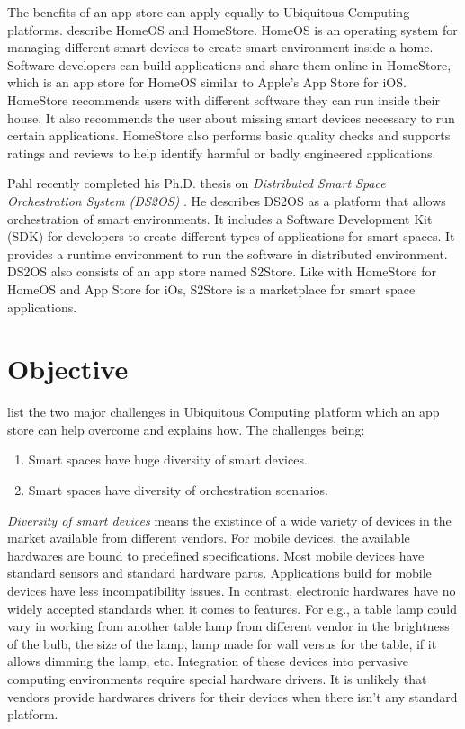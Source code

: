 The benefits of an app store can apply equally to Ubiquitous Computing platforms. \cite{dixon2010home} describe HomeOS and HomeStore. HomeOS is an operating system for managing different smart devices to create smart environment inside a home. Software developers can build applications and share them online in HomeStore, which is an app store for HomeOS similar to Apple's App Store for iOS. HomeStore recommends users with different software they can run inside their house. It also recommends the user about missing smart devices necessary to run certain applications. HomeStore also performs basic quality checks and supports ratings and reviews to help identify harmful or badly engineered applications.

Pahl recently completed his Ph.D. thesis on \emph{Distributed Smart Space Orchestration System (DS2OS)} \cite{pahl2014distributed}. He describes DS2OS as a platform that allows orchestration of smart environments. It includes a Software Development Kit (SDK) for developers to create different types of applications for smart spaces. It provides a runtime environment to run the software in distributed environment. DS2OS also consists of an app store named S2Store. Like with HomeStore for HomeOS and App Store for iOs, S2Store is a marketplace for smart space applications.

\section{Objective}

\cite{pahl2014distributed} list the two major challenges in Ubiquitous Computing platform which an app store can help overcome and explains how. The challenges being:

\begin{enumerate}
  \item Smart spaces have huge diversity of smart devices.
  \item Smart spaces have diversity of orchestration scenarios.
\end{enumerate}

\emph{Diversity of smart devices} means the existince of a wide variety of devices in the market available from different vendors. For mobile devices, the available hardwares are bound to predefined specifications. Most mobile devices have standard sensors and standard hardware parts. Applications build for mobile devices have less incompatibility issues. In contrast, electronic hardwares have no widely accepted standards when it comes to features. For e.g., a table lamp could vary in working from another table lamp from different vendor in the brightness of the bulb, the size of the lamp, lamp made for wall versus for the table, if it allows dimming the lamp, etc. Integration of these devices into pervasive computing environments require special hardware drivers. It is unlikely that vendors provide hardwares drivers for their devices when there isn't any standard platform.


